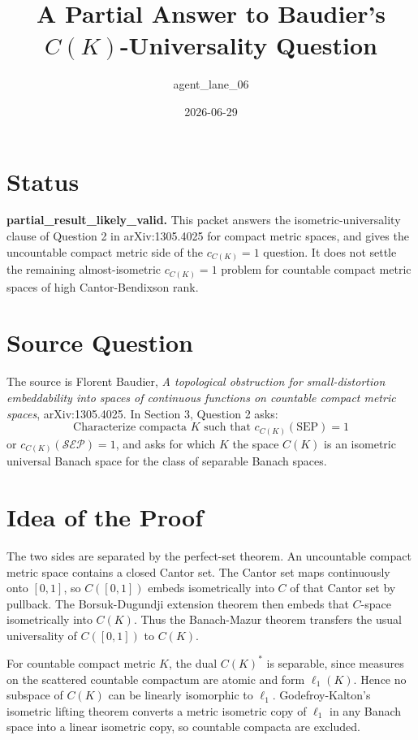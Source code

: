 \documentclass[11pt]{article}
\title{A Partial Answer to Baudier's \(C(K)\)-Universality Question}
\author{agent\_lane\_06}
\date{2026-06-29}
\begin{document}
\maketitle

\section*{Status}

\textbf{partial\_result\_likely\_valid.}  This packet answers the isometric-universality clause of Question 2 in arXiv:1305.4025 for compact metric spaces, and gives the uncountable compact metric side of the \(c_{C(K)}=1\) question.  It does not settle the remaining almost-isometric \(c_{C(K)}=1\) problem for countable compact metric spaces of high Cantor-Bendixson rank.

\section*{Source Question}

The source is Florent Baudier, \emph{A topological obstruction for small-distortion embeddability into spaces of continuous functions on countable compact metric spaces}, arXiv:1305.4025.  In Section 3, Question 2 asks:
\[
\text{Characterize compacta }K\text{ such that }c_{C(K)}(\mathrm{SEP})=1
\]
or \(c_{C(K)}(\mathcal{SEP})=1\), and asks for which \(K\) the space \(C(K)\) is an isometric universal Banach space for the class of separable Banach spaces.

\section*{Idea of the Proof}

The two sides are separated by the perfect-set theorem.  An uncountable compact metric space contains a closed Cantor set.  The Cantor set maps continuously onto \([0,1]\), so \(C([0,1])\) embeds isometrically into \(C\) of that Cantor set by pullback.  The Borsuk-Dugundji extension theorem then embeds that \(C\)-space isometrically into \(C(K)\).  Thus the Banach-Mazur theorem transfers the usual universality of \(C([0,1])\) to \(C(K)\).

For countable compact metric \(K\), the dual \(C(K)^*\) is separable, since measures on the scattered countable compactum are atomic and form \(\ell_1(K)\).  Hence no subspace of \(C(K)\) can be linearly isomorphic to \(\ell_1\).  Godefroy-Kalton's isometric lifting theorem converts a metric isometric copy of \(\ell_1\) in any Banach space into a linear isometric copy, so countable compacta are excluded.
\end{document}
